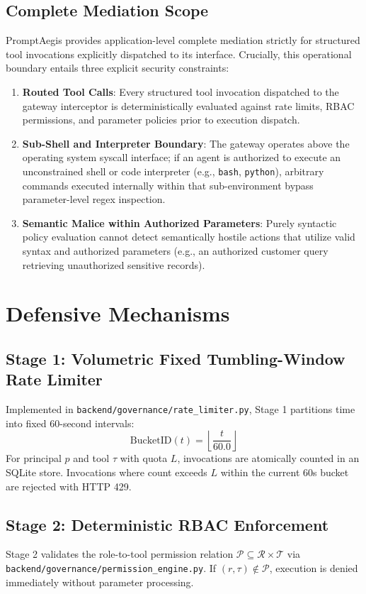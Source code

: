 \documentclass[10pt,twocolumn,letterpaper]{article}
\begin{document}
\subsection{Complete Mediation Scope}
PromptAegis provides application-level complete mediation strictly for structured tool invocations explicitly dispatched to its interface. Crucially, this operational boundary entails three explicit security constraints:
\begin{enumerate}
    \item \textbf{Routed Tool Calls}: Every structured tool invocation dispatched to the gateway interceptor is deterministically evaluated against rate limits, RBAC permissions, and parameter policies prior to execution dispatch.
    \item \textbf{Sub-Shell and Interpreter Boundary}: The gateway operates above the operating system syscall interface; if an agent is authorized to execute an unconstrained shell or code interpreter (e.g., \texttt{bash}, \texttt{python}), arbitrary commands executed internally within that sub-environment bypass parameter-level regex inspection.
    \item \textbf{Semantic Malice within Authorized Parameters}: Purely syntactic policy evaluation cannot detect semantically hostile actions that utilize valid syntax and authorized parameters (e.g., an authorized customer query retrieving unauthorized sensitive records).
\end{enumerate}

\section{Defensive Mechanisms}

\subsection{Stage 1: Volumetric Fixed Tumbling-Window Rate Limiter}
Implemented in \texttt{backend/governance/rate\_limiter.py}, Stage 1 partitions time into fixed 60-second intervals:
\begin{equation}
\text{BucketID}(t) = \left\lfloor \frac{t}{60.0} \right\rfloor
\end{equation}
For principal $p$ and tool $\tau$ with quota $L$, invocations are atomically counted in an SQLite store. Invocations where count exceeds $L$ within the current 60s bucket are rejected with HTTP 429.

\subsection{Stage 2: Deterministic RBAC Enforcement}
Stage 2 validates the role-to-tool permission relation $\mathcal{P} \subseteq \mathcal{R} \times \mathcal{T}$ via \texttt{backend/governance/permission\_engine.py}. If $(r, \tau) \notin \mathcal{P}$, execution is denied immediately without parameter processing.
\end{document}
